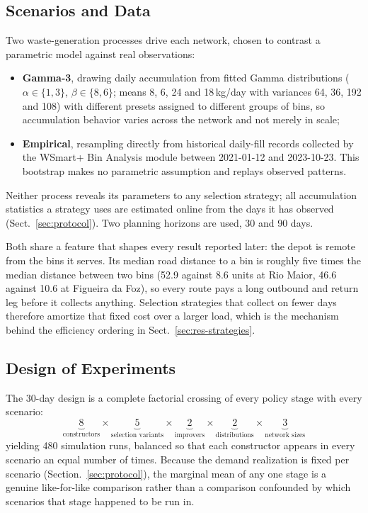 \documentclass[orivec,runningheads]{llncs}
\begin{document}
\subsection{Scenarios and Data}

Two waste-generation processes drive each network, chosen to contrast a
parametric model against real observations:
\begin{itemize}
    \item \textbf{Gamma-3}, drawing daily accumulation from fitted Gamma
          distributions ($\alpha \in \{1,3\}$, $\beta \in \{8,6\}$; means 8, 6,
          24 and 18\,kg/day with variances 64, 36, 192 and 108) with different
          presets assigned to different groups of bins, so accumulation
          behavior varies across the network and not merely in scale;
    \item \textbf{Empirical}, resampling directly from historical daily-fill
          records collected by the WSmart+ Bin Analysis module between
          2021-01-12 and 2023-10-23. This bootstrap makes no parametric
          assumption and replays observed patterns.
\end{itemize}

Neither process reveals its parameters to any selection strategy; all
accumulation statistics a strategy uses are estimated online from the days it
has observed (Sect.~\ref{sec:protocol}). Two planning horizons are used, 30 and
90 days. 

Both share a feature that shapes every result reported later: the depot is
remote from the bins it serves. Its median road distance to a bin is roughly
five times the median distance between two bins (52.9 against 8.6 units at Rio
Maior, 46.6 against 10.6 at Figueira da Foz), so every route pays a long
outbound and return leg before it collects anything. Selection strategies that
collect on fewer days therefore amortize that fixed cost over a larger load,
which is the mechanism behind the efficiency ordering in
Sect.~\ref{sec:res-strategies}.


\subsection{Design of Experiments}

The 30-day design is a complete factorial crossing of every policy stage with
every scenario:
\[
    \underbrace{8}_{\text{constructors}} \times
    \underbrace{5}_{\text{selection variants}} \times
    \underbrace{2}_{\text{improvers}} \times
    \underbrace{2}_{\text{distributions}} \times
    \underbrace{3}_{\text{network sizes}}
\]
yielding 480 simulation runs, balanced so that each constructor appears in every
scenario an equal number of times. Because the demand realization is fixed per
scenario (Section.~\ref{sec:protocol}), the marginal mean of any one stage is a
genuine like-for-like comparison rather than a comparison confounded by which scenarios that stage happened to be run in.
\end{document}
